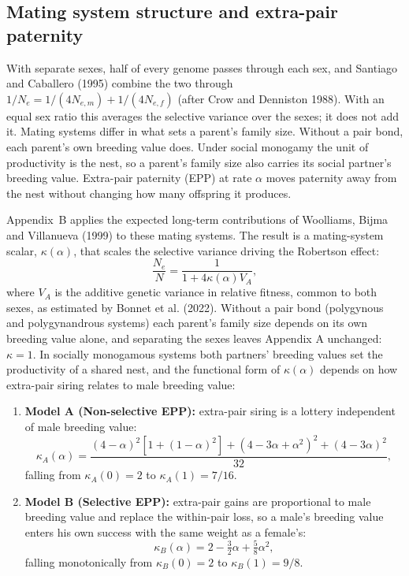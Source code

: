 \documentclass[12pt]{article}
\begin{document}
\subsection{Mating system structure and extra-pair paternity}
With separate sexes, half of every genome passes through each sex, and Santiago and Caballero (1995) combine the two through $1/N_e = 1/(4N_{e,m}) + 1/(4N_{e,f})$ (after Crow and Denniston 1988). With an equal sex ratio this averages the selective variance over the sexes; it does not add it. Mating systems differ in what sets a parent's family size. Without a pair bond, each parent's own breeding value does. Under social monogamy the unit of productivity is the nest, so a parent's family size also carries its social partner's breeding value. Extra-pair paternity (EPP) at rate $\alpha$ moves paternity away from the nest without changing how many offspring it produces.

Appendix~B applies the expected long-term contributions of Woolliams, Bijma and Villanueva (1999) to these mating systems. The result is a mating-system scalar, $\kappa(\alpha)$, that scales the selective variance driving the Robertson effect:
\begin{equation}
    \frac{N_e}{N} = \frac{1}{1 + 4\kappa(\alpha)V_A}, \label{unlinked_mating}
\end{equation}
where $V_A$ is the additive genetic variance in relative fitness, common to both sexes, as estimated by Bonnet et al. (2022). Without a pair bond (polygynous and polygynandrous systems) each parent's family size depends on its own breeding value alone, and separating the sexes leaves Appendix A unchanged: $\kappa = 1$. In socially monogamous systems both partners' breeding values set the productivity of a shared nest, and the functional form of $\kappa(\alpha)$ depends on how extra-pair siring relates to male breeding value:
\begin{enumerate}
    \item \textbf{Model A (Non-selective EPP):} extra-pair siring is a lottery independent of male breeding value:
    \begin{equation}
    \kappa_A(\alpha) = \frac{(4-\alpha)^2\left[1+(1-\alpha)^2\right] + (4-3\alpha+\alpha^2)^2 + (4-3\alpha)^2}{32},
    \end{equation}
    falling from $\kappa_A(0) = 2$ to $\kappa_A(1) = 7/16$.
    \item \textbf{Model B (Selective EPP):} extra-pair gains are proportional to male breeding value and replace the within-pair loss, so a male's breeding value enters his own success with the same weight as a female's:
    \begin{equation}
    \kappa_B(\alpha) = 2 - \tfrac{3}{2}\alpha + \tfrac{5}{8}\alpha^2,
    \end{equation}
    falling monotonically from $\kappa_B(0) = 2$ to $\kappa_B(1) = 9/8$.
\end{enumerate}
\end{document}
